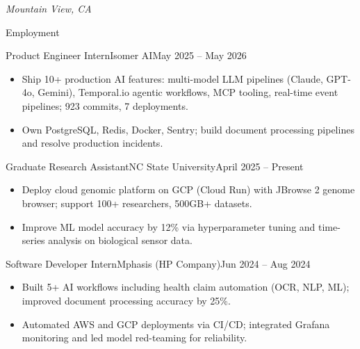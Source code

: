 \documentclass[]{mcdowellcv}
\begin{document}
\makeheader
\begin{center}\vspace{-12pt}\small\textit{Mountain View, CA}\end{center}\vspace{-10pt}

\begin{cvsection}{Employment}
  \begin{cvsubsection}{Product Engineer Intern}{Isomer AI}{May 2025 -- May 2026}
    \begin{itemize}
      \item Ship 10+ production AI features: multi-model LLM pipelines (Claude, GPT-4o, Gemini), Temporal.io agentic workflows, MCP tooling, real-time event pipelines; 923 commits, 7 deployments.
      \item Own PostgreSQL, Redis, Docker, Sentry; build document processing pipelines and resolve production incidents.
    \end{itemize}
    \vspace{-1.5pt}
  \end{cvsubsection}

  \begin{cvsubsection}{Graduate Research Assistant}{NC State University}{April 2025 -- Present}
    \begin{itemize}
      \item Deploy cloud genomic platform on GCP (Cloud Run) with JBrowse 2 genome browser; support 100+ researchers, 500GB+ datasets.
      \item Improve ML model accuracy by 12\% via hyperparameter tuning and time-series analysis on biological sensor data.
    \end{itemize}
    \vspace{-1.5pt}
  \end{cvsubsection}

  \begin{cvsubsection}{Software Developer Intern}{Mphasis (HP Company)}{Jun 2024 -- Aug 2024}
    \begin{itemize}
      \item Built 5+ AI workflows including health claim automation (OCR, NLP, ML); improved document processing accuracy by 25\%.
      \item Automated AWS and GCP deployments via CI/CD; integrated Grafana monitoring and led model red-teaming for reliability.
    \end{itemize}
    \vspace{-1.5pt}
  \end{cvsubsection}


\end{cvsection}
\end{document}
